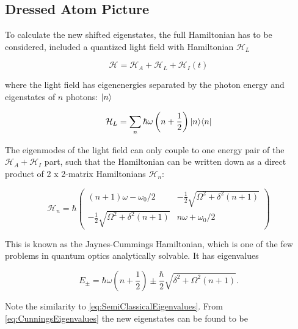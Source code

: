 \subsection{Dressed Atom Picture}\label{sec:DressedApproach}

To calculate the new shifted eigenstates, the full Hamiltonian has to be considered, included a quantized light field with Hamiltonian $\mathcal{H}_L$ \cite{Dalibard1985}

\begin{equation}
	\mathcal{H} = \mathcal{H}_A + \mathcal{H}_L + \mathcal{H}_I(t)
\end{equation}

where the light field has eigenenergies separated by the photon energy and eigenstates of $n$ photons: $\lvert n\rangle$ \cite{Vredenbregt2020}

\begin{equation}\label{eq:RadiationModes}
	\mathcal{H}_L = \sum_n \hbar \omega \left(n+\frac{1}{2}\right) \lvert n\rangle\langle n\rvert
\end{equation}

The eigenmodes of the light field can only couple to one energy pair of the $\mathcal{H}_A + \mathcal{H}_I$ part, such that the Hamiltonian can be written down as a direct product of 2 x 2-matrix Hamiltonians \cite{Vredenbregt2020,Hussin2005} $\mathcal{H}_n$:

\begin{equation}\label{eq:CunningsHamiltonian}
    \mathcal{H}_n = \hbar 
    \begin{pmatrix}
        (n + 1)\omega -\omega_0 / 2                     & -\frac{1}{2}\sqrt{\Omega^2+\delta^2(n+1)} \\
        -\frac{1}{2}\sqrt{\Omega^2 + \delta^2(n+1)}  & n\omega + \omega_0/2
    \end{pmatrix}
\end{equation}

This is known as the Jaynes-Cummings Hamiltonian, which is one of the few problems in quantum optics analytically solvable. It has eigenvalues \cite{Hussin2005}

\begin{equation}\label{eq:CunningsEigenvalues}
    E_{\pm} = \hbar\omega\left(n+\frac{1}{2}\right) \pm \frac{\hbar}{2} \sqrt{\delta^2 + \Omega^2(n+1)}.
\end{equation}

Note the similarity to \cref{eq:SemiClassicalEigenvalues}. From \cref{eq:CunningsEigenvalues} the new eigenstates can be found to be \cite{Hussin2005}


